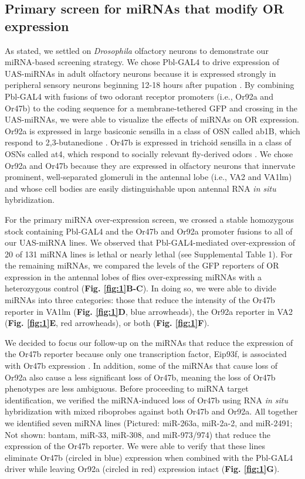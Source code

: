 \subsection*{Primary screen for miRNAs that modify OR expression}

As stated, we settled on \emph{Drosophila} olfactory neurons to demonstrate our miRNA-based screening strategy.
We chose Pbl-GAL4 to drive expression of UAS-miRNAs in adult olfactory neurons because it is expressed strongly in peripheral sensory neurons beginning 12-18 hours after pupation \cite{dnik_Dickson_Luo_Komiyama_2007}.
By combining Pbl-GAL4 with fusions of two odorant receptor promoters (i.e., Or92a and Or47b) to the coding sequence for a membrane-tethered GFP and crossing in the UAS-miRNAs, we were able to visualize the effects of miRNAs on OR expression.
Or92a is expressed in large basiconic sensilla in a class of OSN called ab1B, which respond to 2,3-butanedione \cite{de_Bruyne_Foster_Carlson_2001}.
Or47b is expressed in trichoid sensilla in a class of OSNs called at4, which respond to socially relevant fly-derived odors \cite{vanderGoesvanNaters:2007cq}.
We chose Or92a and Or47b because they are expressed in olfactory neurons that innervate prominent, well-separated glomeruli in the antennal lobe (i.e., VA2 and VA1lm) and whose cell bodies are easily distinguishable upon antennal RNA \emph{in situ} hybridization.

For the primary miRNA over-expression screen, we crossed a stable homozygous stock containing Pbl-GAL4 and the Or47b and Or92a promoter fusions to all of our UAS-miRNA lines.
We observed that Pbl-GAL4-mediated over-expression of 20 of 131 miRNA lines is lethal or nearly lethal (see Supplemental Table 1).
For the remaining miRNAs, we compared the levels of the GFP reporters of OR expression in the antennal lobes of flies over-expressing miRNAs with a heterozygous control (\textbf{Fig. \ref{fig:1}B-C}).
In doing so, we were able to divide miRNAs into three categories: those that reduce the intensity of the Or47b reporter in VA1lm (\textbf{Fig. \ref{fig:1}D}, blue arrowheads), the Or92a reporter in VA2 (\textbf{Fig. \ref{fig:1}E}, red arrowheads), or both (\textbf{Fig. \ref{fig:1}F}).

We decided to focus our follow-up on the miRNAs that reduce the expression of the Or47b reporter because only one transcription factor, Eip93f, is associated with Or47b expression \cite{Brochtrup_Hummel_Alenius_2012}.
In addition, some of the miRNAs that cause loss of Or92a also cause a less significant loss of Or47b, meaning the loss of Or47b phenotypes are less ambiguous.
Before proceeding to miRNA target identification, we verified the miRNA-induced loss of Or47b using RNA \emph{in situ} hybridization with mixed riboprobes against both Or47b and Or92a.
All together we identified seven miRNA lines (Pictured: miR-263a, miR-2a-2, and miR-2491; Not shown: bantam, miR-33, miR-308, and miR-973/974) that reduce the expression of the Or47b reporter.
We were able to verify that these lines eliminate Or47b (circled in blue) expression when combined with the Pbl-GAL4 driver while leaving Or92a (circled in red) expression intact (\textbf{Fig. \ref{fig:1}G}).